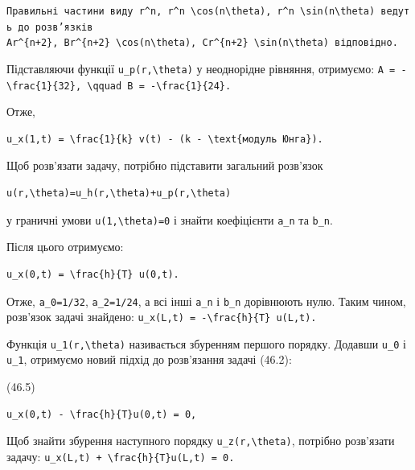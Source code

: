 \documentclass[
  ukrainian,
]{article}
\begin{document}
\texttt{Правильні\ частини\ виду\ \textquotesingle{}r\^{}n\textquotesingle{},\ \textquotesingle{}r\^{}n\ \textbackslash{}cos(n\textbackslash{}theta)\textquotesingle{},\ \textquotesingle{}r\^{}n\ \textbackslash{}sin(n\textbackslash{}theta)\textquotesingle{}\ ведуть\ до\ розв’язків}
\texttt{\textquotesingle{}Ar\^{}\{n+2\}\textquotesingle{},\ \textquotesingle{}Br\^{}\{n+2\}\ \textbackslash{}cos(n\textbackslash{}theta)\textquotesingle{},\ \textquotesingle{}Cr\^{}\{n+2\}\ \textbackslash{}sin(n\textbackslash{}theta)\textquotesingle{}\ відповідно.}

Підставляючи функції \texttt{u\_p(r,\textbackslash{}theta)} у
неоднорідне рівняння, отримуємо:
\texttt{A\ =\ -\textbackslash{}frac\{1\}\{32\},\ \textbackslash{}qquad\ B\ =\ -\textbackslash{}frac\{1\}\{24\}.}

Отже,

\begin{verbatim}
u_x(1,t) = \frac{1}{k} v(t) - (k - \text{модуль Юнга}).
\end{verbatim}

Щоб розв'язати задачу, потрібно підставити загальний розв'язок

\begin{verbatim}
u(r,\theta)=u_h(r,\theta)+u_p(r,\theta)
\end{verbatim}

у граничні умови \texttt{u(1,\textbackslash{}theta)=0} і знайти
коефіцієнти \texttt{a\_n} та \texttt{b\_n}.

Після цього отримуємо:

\begin{verbatim}
u_x(0,t) = \frac{h}{T} u(0,t).
\end{verbatim}

Отже, \texttt{a\_0=1/32}, \texttt{a\_2=1/24}, а всі інші \texttt{a\_n} і
\texttt{b\_n} дорівнюють нулю. Таким чином, розв'язок задачі знайдено:
\texttt{u\_x(L,t)\ =\ -\textbackslash{}frac\{h\}\{T\}\ u(L,t).}

Функція \texttt{u\_1(r,\textbackslash{}theta)} називається збуренням
першого порядку. Додавши \texttt{u\_0} і \texttt{u\_1}, отримуємо новий
підхід до розв'язання задачі (46.2):

(46.5)

\begin{verbatim}
u_x(0,t) - \frac{h}{T}u(0,t) = 0,
\end{verbatim}

Щоб знайти збурення наступного порядку
\texttt{u\_z(r,\textbackslash{}theta)}, потрібно розв'язати задачу:
\texttt{u\_x(L,t)\ +\ \textbackslash{}frac\{h\}\{T\}u(L,t)\ =\ 0.}
\end{document}
